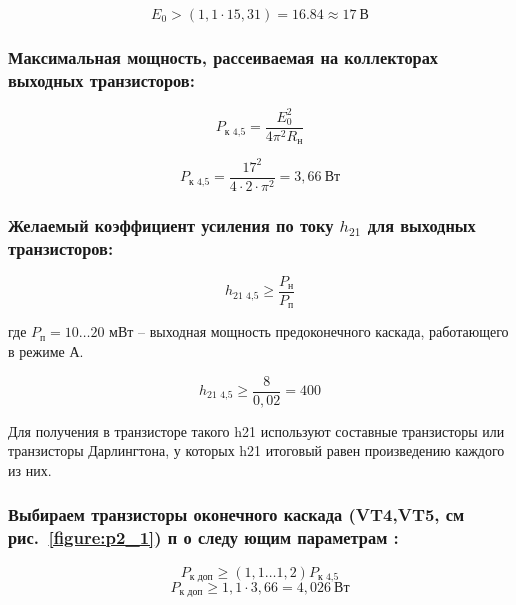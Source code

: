 \begin{equation*}
 E_{\text{0}} > (1,1 \cdot 15,31) = 16.84 \approx 17 ~ \text{В}
\end{equation*}

\subsubsection{Максимальная мощность, рассеиваемая на коллекторах выходных транзисторов:}

\begin{equation}
\label{eq:equation2_5}
 P_{\text{к 4,5}} = \dfrac{E_0^2}{4 \pi^2 R_{\text{н}}}
\end{equation}

\begin{equation*}
 P_{\text{к 4,5}} = \dfrac{ 17^2 }{ 4 \cdot 2 \cdot \pi^2} = 3,66 ~ \text{Вт}
\end{equation*}

\subsubsection{Желаемый коэффициент усиления по току $h_{21}$ для выходных транзисторов:}

\begin{equation}
\label{eq:equation2_6}
 h_{\text{21 4,5}} \geq \dfrac{P_{\text{н}}}{P_{\text{п}}}
\end{equation}

\noindent где $ P_{\text{п}} = 10 \ldots 20 $ мВт -- выходная мощность предоконечного каскада, работающего в режиме А.\par	

\begin{equation*}
 h_{\text{21 4,5}} \geq \dfrac{8}{0,02} = 400
\end{equation*}

Для получения в транзисторе такого h21 используют составные транзисторы или транзисторы Дарлингтона, у которых h21 итоговый равен произведению каждого из них.

\subsubsection{Выбираем транзисторы оконечного каскада (VT4,VT5, см рис.~\ref{figure:p2_1}) п о следу ющим параметрам :}

\begin{equation}
\label{eq:equation2_7}
 P_{\text{к доп}}  \geq (1,1 \ldots 1,2) P_{\text{к 4,5}}
\end{equation}
\begin{equation*}
 P_{\text{к доп}} \geq 1,1 \cdot 3,66 = 4,026 ~ \text{Вт}
\end{equation*}

